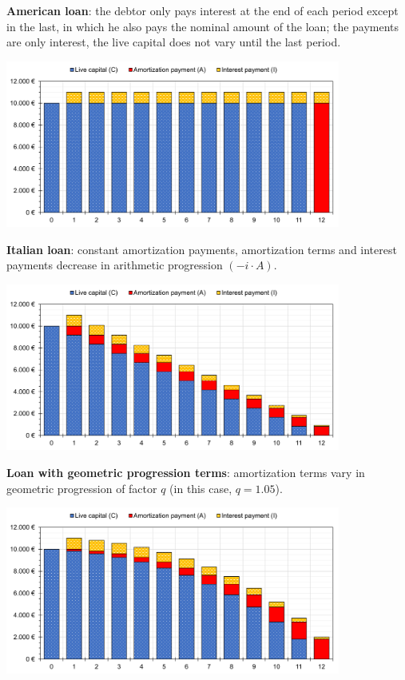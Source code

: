 \documentclass[10pt, a4paper]{article}
\begin{document}
\textbf{American loan}: the debtor only pays interest at the end of each period except in the last, in which he also pays the nominal amount of the loan; the payments are only interest, the live capital does not vary until the last period.

\begin{center}
	\includegraphics[width=11cm]{../figures/american-en.pdf}
\end{center}

\textbf{Italian loan}: constant amortization payments, amortization terms and interest payments decrease in arithmetic progression $(-i \cdot A)$.

\begin{center}
	\includegraphics[width=11cm]{../figures/italian-en.pdf}
\end{center}

\textbf{Loan with geometric progression terms}: amortization terms vary in geometric progression of factor $q$ (in this case, $q = 1.05$).

\begin{center}
	\includegraphics[width=11cm]{../figures/geometric-en.pdf}
\end{center}
\end{document}
